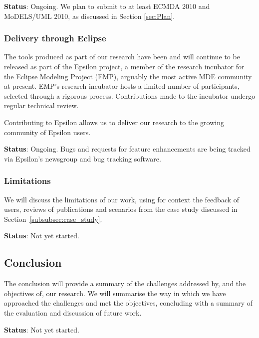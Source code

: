 \textbf{Status}: Ongoing. We plan to submit to at least ECMDA 2010 and MoDELS/UML 2010, as discussed in Section \ref{sec:Plan}.


\subsubsection{Delivery through Eclipse}
The tools produced as part of our research have been and will continue to be released as part of the Epsilon project, a member of the research incubator for the Eclipse Modeling Project (EMP), arguably the most active MDE community at present. EMP's research incubator hosts a limited number of participants, selected through a rigorous process. Contributions made to the incubator undergo regular technical review.

Contributing to Epsilon allows us to deliver our research to the growing community \cite{kolovosthesis} of Epsilon users.

\textbf{Status}: Ongoing. Bugs and requests for feature enhancements are being tracked via Epsilon's newsgroup and bug tracking software.


\subsubsection{Limitations}
We will discuss the limitations of our work, using for context the feedback of users, reviews of publications and scenarios from the case study discussed in Section~\ref{subsubsec:case_study}.

\textbf{Status}: Not yet started.


\subsection{Conclusion}
The conclusion will provide a summary of the challenges addressed by, and the objectives of, our research. We will summarise the way in which we have approached the challenges and met the objectives, concluding with a summary of the evaluation and discussion of future work. 

\textbf{Status}: Not yet started.